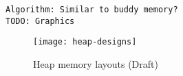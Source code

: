 \texttt{Algorithm: Similar to buddy memory?}\\

\texttt{TODO: Graphics}

\begin{figure}[H]
  \centering
  \texttt{[image: heap-designs]}
  \caption{Heap memory layouts (Draft)}
\end{figure}
